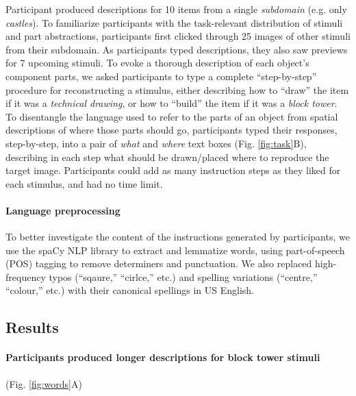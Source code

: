 \documentclass[10pt,letterpaper]{article}
\begin{document}
Participant produced descriptions for 10 items from a single \textit{subdomain} (e.g. only \textit{castles}). 
To familiarize participants with the task-relevant distribution of stimuli and part abstractions, participants first clicked through 25 images of other stimuli from their subdomain. 
As participants typed descriptions, they also saw previews for 7 upcoming stimuli.
To evoke a thorough description of each object's component parts, we asked participants to type a complete ``step-by-step'' procedure for reconstructing a stimulus, either describing how to ``draw'' the item if it was a \textit{technical drawing}, or how to ``build'' the item if it was a \textit{block tower}.
To disentangle the language used to refer to the parts of an object from spatial descriptions of where those parts should go, participants typed their responses, step-by-step, into a pair of \textit{what} and \textit{where} text boxes (Fig. \ref{fig:task}B), describing in each step what should be drawn/placed where to reproduce the target image.
Participants could add as many instruction steps as they liked for each stimulus, and had no time limit.



\paragraph{Language preprocessing} %
To better investigate the content of the instructions generated by participants, we use the spaCy NLP library to extract and lemmatize words, using part-of-speech (POS) tagging to remove determiners and punctuation. We also replaced high-frequency typos (``sqaure,'' ``cirlce,'' etc.) and spelling variations (``centre,'' ``colour,'' etc.) with their canonical spellings in US English.

\subsection{Results}

\paragraph{Participants produced longer descriptions for block tower stimuli}

(Fig. \ref{fig:words}A)
\end{document}
